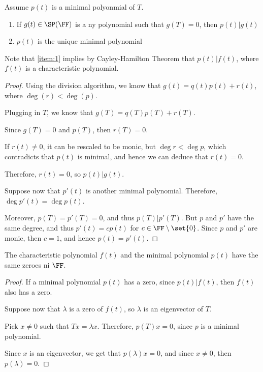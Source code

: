 \documentclass[11pt]{scrartcl}
\begin{document}
\begin{theorem}
Assume $p(t)$ is a minimal polyonmial of $T$.

\begin{enumerate}[label=\alph*)]
\item \label{item:1} If $g(t) \in \SP(\FF)$ is a ny polynomial such that $g(T) = 0$, then $p(t) | g(t)$
\item $p(t)$ is the unique minimal polynomial
\end{enumerate}
\end{theorem}
\begin{remark}
  Note that \ref{item:1} implies by Cayley-Hamilton Theorem that $p(t) | f(t)$, where $f(t)$ is a characteristic polynomial.
\end{remark}
\begin{proof}
  \hfill

Using the division algorithm, we know that $g(t) = q(t)p(t) +r(t)$, where $\deg(r) < \deg (p)$.

Plugging in $T$, we know that $g(T) = q(T) p(T) + r(T)$.

Since $g(T) = 0$ and $p(T)$, then $r(T) = 0$.

If $r(t) \neq 0$, it can be rescaled to be monic, but
$\deg r < \deg p$, which contradicts that $p(t)$ is minimal, and hence
we can deduce that $r(t) = 0$.

Therefore, $r(t) = 0$, so $p(t) | g(t)$.

Suppose now that $p'(t)$ is another minimal polynomial. Therefore, $\deg p'(t) = \deg p(t)$.

Moreover, $p(T) = p'(T) = 0$, and thus $p(T) | p'(T)$. But $p$ and $p'$ have the same degree, and thus $p'(t) = cp(t)$ for $c\in \FF\setminus \set{0}$. Since $p$ and $p'$ are monic, then $c=1$, and hence $p(t) = p'(t)$.
\end{proof}

\begin{theorem}
\label{sec:uniq-minim-polyn}
The characteristic polynomial $f(t)$ and the minimal polynomial $p(t)$ have the same zeroes ni $\FF$.
\end{theorem}

\begin{proof}
  \hfill

  If a minimal polynomial $p(t)$ has a zero, since $p(t) | f(t)$, then $f(t)$ also has a zero.

  Suppose now that $\lambda$ is a zero of $f(t)$, so $\lambda$ is an eigenvector of $T$.

  Pick $x\neq 0$ such that $Tx = \lambda x$. Therefore, $p(T) x = 0$,
  since $p$ is a minimal polynomial.

  Since $x$ is an eigenvector, we get that $p(\lambda) x = 0$, and
  since $x\neq 0$, then $p(\lambda) = 0$.
\end{proof}
\end{document}
